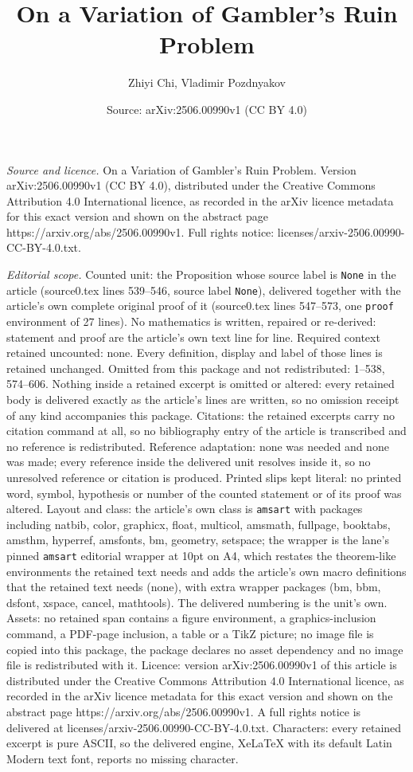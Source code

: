 \documentclass[10pt,a4paper]{amsart}
\title[On a Variation of Gambler's Ruin Problem]{On a Variation of Gambler's Ruin Problem}
\author{Zhiyi Chi, Vladimir Pozdnyakov}
\date{Source: arXiv:2506.00990v1 (CC BY 4.0)}
\begin{document}
\maketitle

\noindent\emph{Source and licence.} On a Variation of Gambler's Ruin Problem. Version arXiv:2506.00990v1 (CC BY 4.0), distributed under the Creative Commons Attribution 4.0 International licence, as recorded in the arXiv licence metadata for this exact version and shown on the abstract page https://arxiv.org/abs/2506.00990v1. Full rights notice: licenses/arxiv-2506.00990-CC-BY-4.0.txt.\par\smallskip

\noindent\textit{Editorial scope.} Counted unit: the Proposition whose source label is \texttt{None} in the article (source0.tex lines 539--546, source label \texttt{None}), delivered together with the article's own complete original proof of it (source0.tex lines 547--573, one \texttt{proof} environment of 27 lines). No mathematics is written, repaired or re-derived: statement and proof are the article's own text line for line. Required context retained uncounted: none. Every definition, display and label of those lines is retained unchanged. Omitted from this package and not redistributed: 1--538, 574--606. Nothing inside a retained excerpt is omitted or altered: every retained body is delivered exactly as the article's lines are written, so no omission receipt of any kind accompanies this package. Citations: the retained excerpts carry no citation command at all, so no bibliography entry of the article is transcribed and no reference is redistributed. Reference adaptation: none was needed and none was made; every reference inside the delivered unit resolves inside it, so no unresolved reference or citation is produced. Printed slips kept literal: no printed word, symbol, hypothesis or number of the counted statement or of its proof was altered. Layout and class: the article's own class is \texttt{amsart} with packages including natbib, color, graphicx, float, multicol, amsmath, fullpage, booktabs, amsthm, hyperref, amsfonts, bm, geometry, setspace; the wrapper is the lane's pinned \texttt{amsart} editorial wrapper at 10pt on A4, which restates the theorem-like environments the retained text needs and adds the article's own macro definitions that the retained text needs (none), with extra wrapper packages (bm, bbm, dsfont, xspace, cancel, mathtools). The delivered numbering is the unit's own. Assets: no retained span contains a figure environment, a graphics-inclusion command, a PDF-page inclusion, a table or a TikZ picture; no image file is copied into this package, the package declares no asset dependency and no image file is redistributed with it. Licence: version arXiv:2506.00990v1 of this article is distributed under the Creative Commons Attribution 4.0 International licence, as recorded in the arXiv licence metadata for this exact version and shown on the abstract page https://arxiv.org/abs/2506.00990v1. A full rights notice is delivered at licenses/arxiv-2506.00990-CC-BY-4.0.txt. Characters: every retained excerpt is pure ASCII, so the delivered engine, XeLaTeX with its default Latin Modern text font, reports no missing character.
\end{document}

